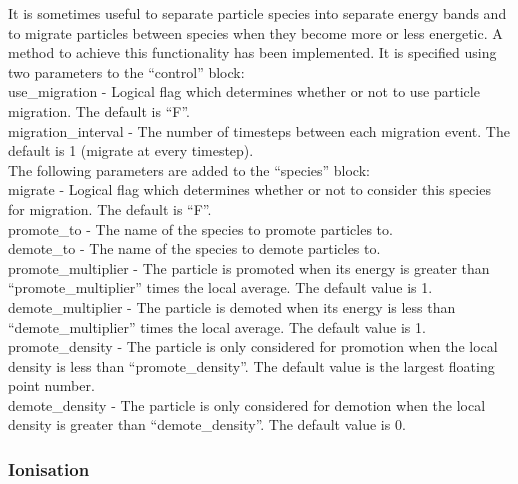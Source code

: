 It is sometimes useful to separate particle species into separate energy
bands and to migrate particles between species when they become more or
less energetic. A method to achieve this functionality has been implemented.
It is specified using two parameters to the ``control'' block:\\

{\emphtext use\_migration} - Logical flag which determines whether or not to
  use particle migration. The default is ``F''.\\

{\emphtext migration\_interval} - The number of timesteps between each
  migration event.  The default is 1 (migrate at every timestep).\\

The following parameters are added to the ``species'' block:\\

{\emphtext migrate} - Logical flag which determines whether or not to consider
  this species for migration. The default is ``F''.\\

{\emphtext promote\_to} - The name of the species to promote particles to.\\

{\emphtext demote\_to} - The name of the species to demote particles to.\\

{\emphtext promote\_multiplier} - The particle is promoted when its energy is
  greater than ``promote\_multiplier'' times the local average.  The default
  value is 1.\\

{\emphtext demote\_multiplier}  - The particle is demoted when its energy is
  less than ``demote\_multiplier'' times the local average.  The default value
  is 1.\\

{\emphtext promote\_density} - The particle is only considered for promotion
  when the local density is less than ``promote\_density''.  The default value
  is the largest floating point number.\\

{\emphtext demote\_density}  - The particle is only considered for demotion
  when the local density is greater than ``demote\_density''.  The default
  value is 0.\\


\subsubsection{Ionisation}
\label{sec:ionisation}

